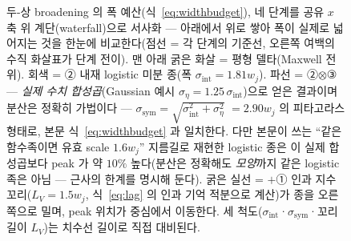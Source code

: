\begin{figure}[t]
{%
}
\caption{두-상 broadening 의 폭 예산(식~\eqref{eq:widthbudget}), 네 단계를 공유 $x$ 축 위 계단(waterfall)으로
서사화 --- 아래에서 위로 쌓아 폭이 실제로 넓어지는 것을 한눈에 비교한다(점선 = 각 단계의 기준선, 오른쪽 여백의
수직 화살표가 단계 전이). 맨 아래 굵은 화살 = 평형 델타(Maxwell 전위). 회색 = ② 내재 logistic 미분 종(폭
$\sigma_\mathrm{int}=1.81w_j$). 파선 = ②$\otimes$③ --- \emph{실제 수치 합성곱}(Gaussian 예시
$\sigma_\eta=1.25\,\sigma_\mathrm{int}$)으로
얻은 결과이며 분산은 정확히 가법이다 --- $\sigma_\mathrm{sym}=\sqrt{\sigma_\mathrm{int}^2+\sigma_\eta^2}$
$=2.90w_j$ 의 피타고라스 형태로, 본문 식~\eqref{eq:widthbudget} 과 일치한다. 다만 본문이 쓰는 ``같은 함수족이면 유효 scale
$1.6w_j$'' 지름길로 재현한 logistic 종은 이 실제 합성곱보다 peak 가 약 $10\%$ 높다(분산은
정확해도 \emph{모양}까지 같은 logistic 족은 아님 --- 근사의 한계를 명시해 둔다). 굵은 실선 = $+$① 인과
지수 꼬리($L_V=1.5w_j$, 식~\eqref{eq:lag} 의 인과 기억 적분으로 계산)가 종을 오른쪽으로 밀며,
peak 위치가 중심에서 이동한다. 세 척도($\sigma_\mathrm{int}$·$\sigma_\mathrm{sym}$·꼬리 길이 $L_V$)는
치수선 길이로 직접 대비된다.}
\label{fig:widthbudget}
\end{figure}

